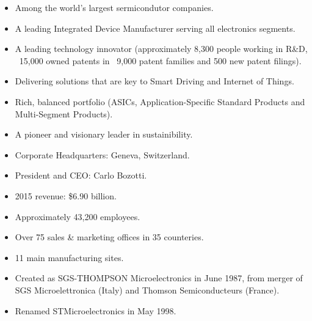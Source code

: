 \begin{itemize}
	\item Among the world's largest sermicondutor companies.
	\item A leading Integrated Device Manufacturer serving all electronics segments.
	\item A leading technology innovator (approximately 8,300 people working in R\&D, ~15,000 owned patents in ~9,000 patent families and 500 new patent filings).
	\item Delivering solutions that are key to Smart Driving and Internet of Things.
	\item Rich, balanced portfolio (ASICs, Application-Specific Standard Products and Multi-Segment Products).
	\item A pioneer and visionary leader in sustainibility.
	\item Corporate Headquarters: Geneva, Switzerland.
	\item President and CEO: Carlo Bozotti.
	\item 2015 revenue: \$6.90 billion.
	\item Approximately 43,200 employees.
	\item Over 75 sales \& marketing offices in 35 counteries.
	\item 11 main manufacturing sites.
	\item Created as SGS-THOMPSON Microelectronics in June 1987, from merger of SGS Microelettronica (Italy) and Thomson Semiconducteurs (France).
	\item Renamed STMicroelectronics in May 1998.
\end{itemize}
